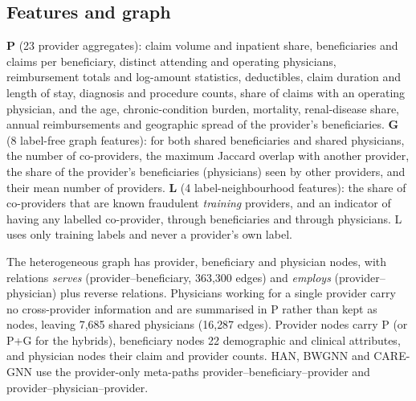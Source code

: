 \documentclass[pdflatex,sn-vancouver-num]{sn-jnl}
\begin{document}
\subsection{Features and graph}
\textbf{P} (23 provider aggregates): claim volume and inpatient share,
beneficiaries and claims per beneficiary, distinct attending and operating
physicians, reimbursement totals and log-amount statistics, deductibles,
claim duration and length of stay, diagnosis and procedure counts, share of
claims with an operating physician, and the age, chronic-condition burden,
mortality, renal-disease share, annual reimbursements and geographic spread
of the provider's beneficiaries. \textbf{G} (8 label-free graph features):
for both shared beneficiaries and shared physicians, the number of
co-providers, the maximum Jaccard overlap with another provider, the share
of the provider's beneficiaries (physicians) seen by other providers, and
their mean number of providers. \textbf{L} (4 label-neighbourhood
features): the share of co-providers that are known fraudulent
\emph{training} providers, and an indicator of having any labelled
co-provider, through beneficiaries and through physicians. L uses only
training labels and never a provider's own label.

The heterogeneous graph has provider, beneficiary and physician nodes, with
relations \emph{serves} (provider--beneficiary, 363{,}300 edges) and
\emph{employs} (provider--physician) plus reverse relations. Physicians
working for a single provider carry no cross-provider information and are
summarised in P rather than kept as nodes, leaving 7{,}685 shared physicians
(16{,}287 edges). Provider nodes carry P (or P+G for the hybrids),
beneficiary nodes 22 demographic and clinical attributes, and physician nodes
their claim and provider counts. HAN, BWGNN and CARE-GNN use the provider-only meta-paths
provider--beneficiary--provider and provider--physician--provider.
\end{document}
